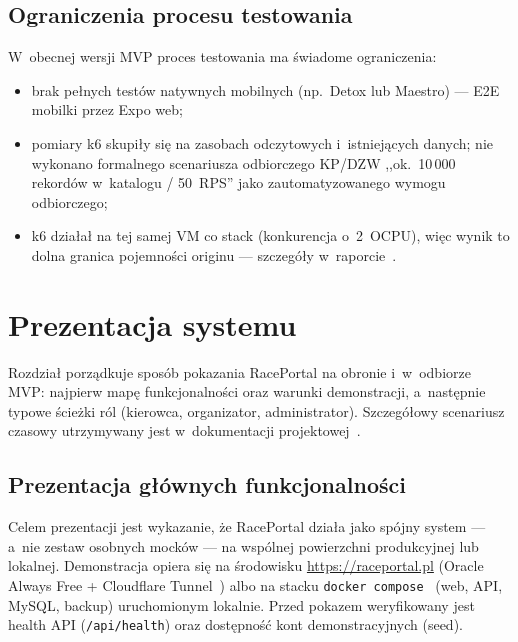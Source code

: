 \documentclass{sprz}
\begin{document}
\section{Ograniczenia procesu testowania}
W~obecnej wersji MVP proces testowania ma świadome ograniczenia:
\begin{itemize}
  \item brak pełnych testów natywnych mobilnych (np.\ Detox lub Maestro) --- E2E mobilki przez Expo web;
  \item pomiary k6 skupiły się na zasobach odczytowych i~istniejących danych; nie wykonano formalnego scenariusza odbiorczego KP/DZW ,,ok.\ 10\,000 rekordów w~katalogu / 50~RPS'' jako zautomatyzowanego wymogu odbiorczego;
  \item k6 działał na tej samej VM co stack (konkurencja o~2~OCPU), więc wynik to dolna granica pojemności originu --- szczegóły w~raporcie~\cite{k6:vm-rps}.
\end{itemize}

\chapter{Prezentacja systemu}
\label{ch:prezentacja}
Rozdział porządkuje sposób pokazania RacePortal na obronie i~w~odbiorze MVP: najpierw mapę funkcjonalności oraz warunki demonstracji, a~następnie typowe ścieżki ról (kierowca, organizator, administrator). Szczegółowy scenariusz czasowy utrzymywany jest w~dokumentacji projektowej~\cite{raceportal:demo}.

\section{Prezentacja głównych funkcjonalności}
Celem prezentacji jest wykazanie, że RacePortal działa jako spójny system --- a~nie zestaw osobnych mocków --- na wspólnej powierzchni produkcyjnej lub lokalnej. Demonstracja opiera się na środowisku \url{https://raceportal.pl} (Oracle Always Free + Cloudflare Tunnel~\cite{cloudflare:tunnel}) albo na stacku \texttt{docker compose}~\cite{docker:compose} (web, API, MySQL, backup) uruchomionym lokalnie. Przed pokazem weryfikowany jest health API (\texttt{/api/health}) oraz dostępność kont demonstracyjnych (seed).
\end{document}
